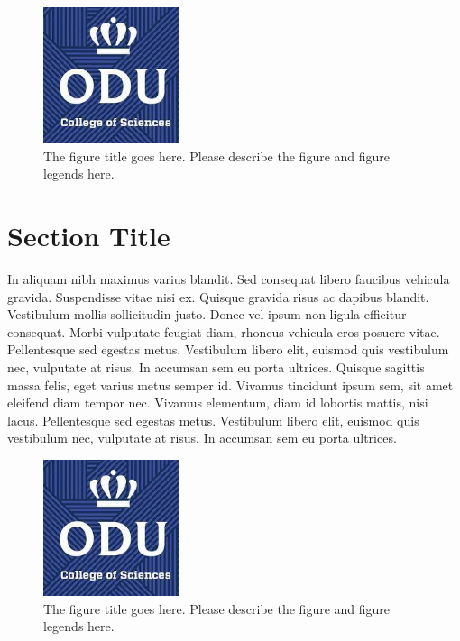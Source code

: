 \begin{figure}[tbh]
  \centering
  \includegraphics[height=4cm]{Figures/cos1.jpeg}
  \caption[The figure title goes here.]{The figure title goes here. Please describe the figure and figure legends here.}
  \label{fig:cos1_10}
\end{figure}

\section{Section Title}
In aliquam nibh maximus varius blandit. Sed consequat libero faucibus vehicula gravida. Suspendisse vitae nisi ex. Quisque gravida risus ac dapibus blandit. Vestibulum mollis sollicitudin justo. Donec vel ipsum non ligula efficitur consequat. Morbi vulputate feugiat diam, rhoncus vehicula eros posuere vitae. Pellentesque sed egestas metus. Vestibulum libero elit, euismod quis vestibulum nec, vulputate at risus. In accumsan sem eu porta ultrices. Quisque sagittis massa felis, eget varius metus semper id. Vivamus tincidunt ipsum sem, sit amet eleifend diam tempor nec. Vivamus elementum, diam id lobortis mattis, nisi lacus. Pellentesque sed egestas metus. Vestibulum libero elit, euismod quis vestibulum nec, vulputate at risus. In accumsan sem eu porta ultrices.


\begin{figure}[tbh]
  \centering
  \includegraphics[height=4cm]{Figures/cos1.jpeg}
  \caption[The figure title goes here.]{The figure title goes here. Please describe the figure and figure legends here.}
  \label{fig:cos1_11}
\end{figure}

